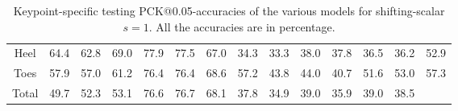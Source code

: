\documentclass[./main.tex]{subfiles}
\begin{document}
\begin{table}[htbp]
\begin{adjustbox}{center}
\begin{tabular}{c||ccc|ccc|ccc|ccc|c}
            Heel & 64.4 & 62.8 & 69.0 & 77.9 & 77.5 & 67.0 & 34.3 & 33.3 & 38.0 & 37.8 & 36.5 & 36.2 & 52.9 \\
            Toes & 57.9 & 57.0 & 61.2 & 76.4 & 76.4 & 68.6 & 57.2 & 43.8 & 44.0 & 40.7 & 51.6 & 53.0 & 57.3 \\
            \hline
            Total & 49.7 & 52.3 & 53.1 & 76.6 & 76.7 & 68.1 & 37.8 & 34.9 & 39.0 & 35.9 & 39.0 & 38.5 & \\
            \hline
        \end{tabular}
    \end{adjustbox}
    \caption{Keypoint-specific testing PCK@0.05-accuracies of the various models for shifting-scalar $s = 1$. All the accuracies are in percentage.}
    \label{tab:finetune_kpts_test_accs_05_1}
\end{table}
\end{document}
